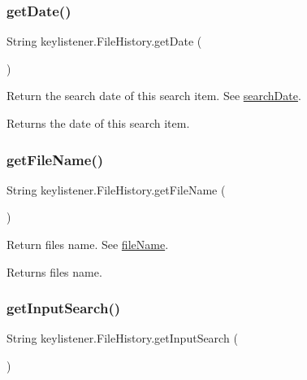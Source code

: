 \subsubsection{\texorpdfstring{get\+Date()}{getDate()}}
{\footnotesize\ttfamily String keylistener.\+File\+History.\+get\+Date (\begin{DoxyParamCaption}{ }\end{DoxyParamCaption})\hspace{0.3cm}{\ttfamily [inline]}}

Return the search date of this search item. See \hyperlink{classkeylistener_1_1_file_history_aa05796c787baef3237827630d3284496}{search\+Date}. \begin{DoxyReturn}{Returns}
the date of this search item. 
\end{DoxyReturn}
\mbox{\label{classkeylistener_1_1_file_history_a3566b314572e386b54c140ab4936590b}} 
\subsubsection{\texorpdfstring{get\+File\+Name()}{getFileName()}}
{\footnotesize\ttfamily String keylistener.\+File\+History.\+get\+File\+Name (\begin{DoxyParamCaption}{ }\end{DoxyParamCaption})\hspace{0.3cm}{\ttfamily [inline]}}

Return file\textquotesingle{}s name. See \hyperlink{classkeylistener_1_1_file_history_aa039d04ae73d6098a0d63f42dcf7a953}{file\+Name}. \begin{DoxyReturn}{Returns}
file\textquotesingle{}s name. 
\end{DoxyReturn}
\mbox{\label{classkeylistener_1_1_file_history_a33c2c0514f7fc3614f428504dd74276d}} 
\subsubsection{\texorpdfstring{get\+Input\+Search()}{getInputSearch()}}
{\footnotesize\ttfamily String keylistener.\+File\+History.\+get\+Input\+Search (\begin{DoxyParamCaption}{ }\end{DoxyParamCaption})\hspace{0.3cm}{\ttfamily [inline]}}


